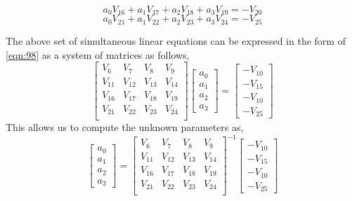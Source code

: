 \documentclass[letterpaper%
, twoside%
, 12pt%
,memoire%
, english%
,creativecommons,hyperref%
]{thETS}
\begin{document}
\begin{equation}\label{eqn.129}
a_{0} V_{16} + a_{1}V_{17} + a_{2}V_{18} + a_{3}V_{19} = -V_{20}
\end{equation}
\begin{equation}\label{eqn.129.5}
a_{0} V_{21} + a_{1}V_{22} + a_{2}V_{23} + a_{3}V_{24} = -V_{25}
\end{equation}
\par The above set of simultaneous linear equations can be expressed in the form of \eqref{eqn:98} as a system of matrices as follows,
\begin{equation}\label{eqn.130}
\begin{bmatrix}
	V_{6}&V_{7}&V_{8}&V_{9}\\
	V_{11}&V_{12}&V_{13}&V_{14}\\
	V_{16}&V_{17}&V_{18}&V_{19}\\
	V_{21}&V_{22}&V_{23}&V_{24}\\
\end{bmatrix}
\begin{bmatrix}
	a_{0}\\
	a_{1}\\
	a_{2}\\
	a_{3}
\end{bmatrix}
=\begin{bmatrix}
	-V_{10}\\
	-V_{15}\\
	-V_{10}\\
	-V_{25}
\end{bmatrix}
\end{equation}
This allows us to compute the unknown parameters as,
\begin{equation}\label{eqn.131}
\begin{bmatrix}
	a_{0}\\
	a_{1}\\
	a_{2}\\
	a_{3}
\end{bmatrix}
={\begin{bmatrix}
	V_{6}&V_{7}&V_{8}&V_{9}\\
	V_{11}&V_{12}&V_{13}&V_{14}\\
	V_{16}&V_{17}&V_{18}&V_{19}\\
	V_{21}&V_{22}&V_{23}&V_{24}\\
\end{bmatrix}}^{-1}
\begin{bmatrix}
	-V_{10}\\
	-V_{15}\\
	-V_{10}\\
	-V_{25}
\end{bmatrix}
\end{equation}
\end{document}
